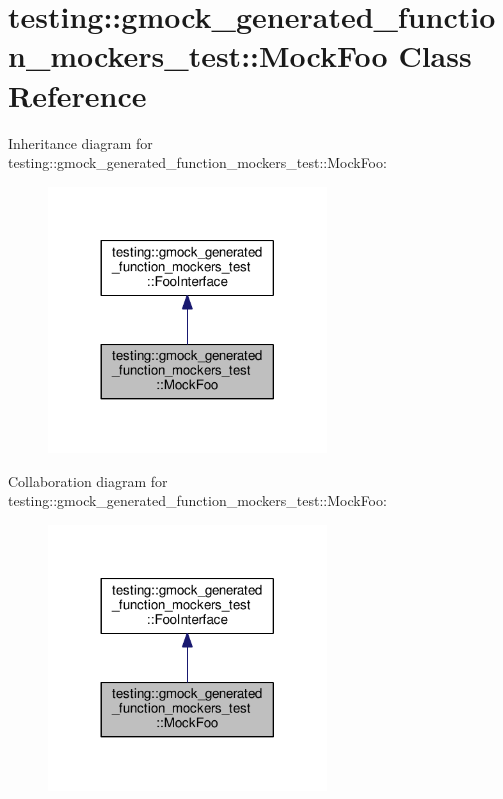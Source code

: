 \hypertarget{classtesting_1_1gmock__generated__function__mockers__test_1_1MockFoo}{}\section{testing\+:\+:gmock\+\_\+generated\+\_\+function\+\_\+mockers\+\_\+test\+:\+:Mock\+Foo Class Reference}
\label{classtesting_1_1gmock__generated__function__mockers__test_1_1MockFoo}


Inheritance diagram for testing\+:\+:gmock\+\_\+generated\+\_\+function\+\_\+mockers\+\_\+test\+:\+:Mock\+Foo\+:
\nopagebreak
\begin{figure}[H]
\begin{center}
\leavevmode
\includegraphics[width=209pt]{classtesting_1_1gmock__generated__function__mockers__test_1_1MockFoo__inherit__graph}
\end{center}
\end{figure}


Collaboration diagram for testing\+:\+:gmock\+\_\+generated\+\_\+function\+\_\+mockers\+\_\+test\+:\+:Mock\+Foo\+:
\nopagebreak
\begin{figure}[H]
\begin{center}
\leavevmode
\includegraphics[width=209pt]{classtesting_1_1gmock__generated__function__mockers__test_1_1MockFoo__coll__graph}
\end{center}
\end{figure}
